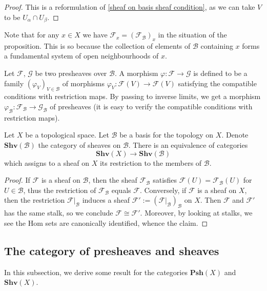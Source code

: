 \begin{proof}
This is a reformulation of \cref{sheaf on basis sheaf condition}, as we can take $V$ to be $U_\alpha\cap U_\beta$.
\end{proof}
Note that for any $x\in X$ we have $\mathscr{F}_x=(\mathscr{F}_{\mathcal{B}})_x$ in the situation of the proposition. This is so because the collection of elements of $\mathcal{B}$ containing $x$ forms a fundamental system of open neighbourhoods of $x$.\par
Let $\mathscr{F}$, $\mathscr{G}$ be two presheaves over $\mathcal{B}$. A morphism $\varphi:\mathscr{F}\to\mathscr{G}$ is defined to be a family $(\varphi_V)_{V\in\mathcal{B}}$ of morphisms $\varphi_V:\mathscr{F}(V)\to\mathscr{F}(V)$ satisfying the compatible conditions with restriction maps. By passing to inverse limits, we get a morphism $\varphi_{\mathcal{B}}:\mathscr{F}_{\mathcal{B}}\to\mathscr{G}_{\mathcal{B}}$ of presheaves (it is easy to verify the compatible conditions with restriction maps).
\begin{theorem}
Let $X$ be a topological space. Let $\mathcal{B}$ be a basis for the topology on $X$. Denote $\mathbf{Shv}(\mathcal{B})$ the category of sheaves on $\mathcal{B}$. There is an equivalence of categories
\[\mathbf{Shv}(X)\to\mathbf{Shv}(\mathcal{B})\]
which assigns to a sheaf on $X$ its restriction to the members of $\mathcal{B}$.
\end{theorem}
\begin{proof}
If $\mathscr{F}$ is a sheaf on $\mathcal{B}$, then the sheaf $\mathscr{F}_{\mathcal{B}}$ satisfies $\mathscr{F}(U)=\mathscr{F}_{\mathcal{B}}(U)$ for $U\in\mathcal{B}$, thus the restriction of $\mathscr{F}_{\mathcal{B}}$ equals $\mathscr{F}$. Conversely, if $\mathscr{F}$ is a sheaf on $X$, then the restriction $\mathscr{F}|_{\mathcal{B}}$ induces a sheaf $\mathscr{F}':=(\mathscr{F}|_{\mathcal{B}})_{\mathcal{B}}$ on $X$. Then $\mathscr{F}$ and $\mathscr{F}'$ has the same stalk, so we conclude $\mathscr{F}\cong\mathscr{F}'$. Moreover, by looking at stalks, we see the Hom sets are canonically identified, whence the claim.
\end{proof}
\subsection{The category of presheaves and sheaves}
In this subsection, we derive some result for the categories $\mathbf{Psh}(X)$ and $\mathbf{Shv}(X)$.
